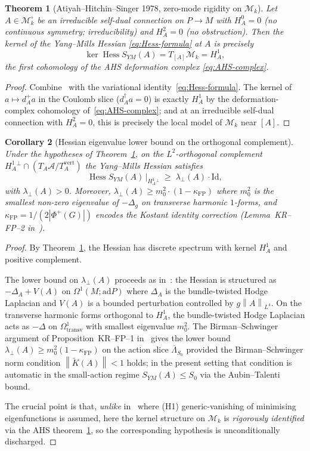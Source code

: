 \documentclass[11pt,a4paper]{amsart}
\newtheorem{theorem}{Theorem}[section]
\newtheorem{corollary}[theorem]{Corollary}
\theoremstyle{definition}
\newcommand{\norm}[1]{\left\lVert#1\right\rVert}
\newcommand{\ad}{\mathrm{ad}}
\newcommand{\Mmod}{\mathcal{M}}
\DeclareMathOperator{\Hess}{Hess}
\newcommand{\kFP}{\kappa_{\mathrm{FP}}}
\begin{document}
\begin{theorem}[Atiyah--Hitchin--Singer 1978, zero-mode rigidity on $\Mmod_k$]
\label{thm:AHS}
Let $A\in\Mmod_k^\circ$ be an irreducible self-dual connection on
$P\to M$ with $H^0_A = 0$ (no continuous symmetry; irreducibility) and
$H^2_A = 0$ (no obstruction). Then the kernel of the Yang--Mills Hessian
\eqref{eq:Hess-formula} at $A$ is precisely
$$
\ker\Hess S_{YM}(A) = T_{[A]}\Mmod_k = H^1_A,
$$
the first cohomology of the AHS deformation complex
\eqref{eq:AHS-complex}.
\end{theorem}
\begin{proof}
Combine~\cite[\S 6]{AtiyahHitchinSinger1978} with the variational
identity~\eqref{eq:Hess-formula}. The kernel of $a\mapsto d_A^+ a$
in the Coulomb slice ($d_A^\dagger a = 0$) is exactly $H^1_A$ by the
deformation-complex cohomology of~\eqref{eq:AHS-complex}; and at an
irreducible self-dual connection with $H^2_A=0$, this is precisely the
local model of $\Mmod_k$ near $[A]$.
\end{proof}

\begin{corollary}[Hessian eigenvalue lower bound on the orthogonal complement]
\label{cor:Hess-gap}
Under the hypotheses of Theorem~\ref{thm:AHS}, on the $L^2$-orthogonal
complement $H^1_A{}^\perp \cap (T_A\mathcal A / T_A^\mathrm{vert})$ the
Yang--Mills Hessian satisfies
$$
\Hess S_{YM}(A)\,\bigl|_{H^1_A{}^\perp} \;\geq\; \lambda_\perp(A) \cdot
\mathrm{Id},
$$
with $\lambda_\perp(A) > 0$. Moreover, $\lambda_\perp(A) \geq m_0^2 \cdot
(1 - \kFP)$ where $m_0^2$ is the smallest non-zero eigenvalue of
$-\Delta_g$ on transverse harmonic $1$-forms, and
$\kFP = 1/(2|\Phi^+(G)|)$ encodes the Kostant identity correction
(Lemma~KR--FP--2 in~\cite{RemondiereKRFP3_2026}).
\end{corollary}
\begin{proof}
By Theorem~\ref{thm:AHS}, the Hessian has discrete spectrum with kernel
$H^1_A$ and positive complement.

The lower bound on $\lambda_\perp(A)$ proceeds as in~\cite[\S 4]{RemondiereKRFP3_2026}:
the Hessian is structured as $-\Delta_A + V(A)$ on
$\Omega^1(M;\ad P)$ where $\Delta_A$ is the bundle-twisted
Hodge Laplacian and $V(A)$ is a bounded perturbation controlled by
$g\norm{A}_{L^4}$. On the transverse harmonic forms orthogonal to
$H^1_A$, the bundle-twisted Hodge Laplacian acts as $-\Delta$ on
$\Omega^{1}_\mathrm{transv}$ with smallest eigenvalue $m_0^2$. The
Birman--Schwinger argument of Proposition~KR--FP--1
in~\cite{RemondiereKRFP3_2026} gives the lower bound
$\lambda_\perp(A) \geq m_0^2 (1 - \kFP)$ on the action slice
$\overline\Lambda_{S_0}$ provided the Birman--Schwinger norm condition
$\norm{\widetilde K(A)} < 1$ holds; in the present setting that condition
is automatic in the small-action regime $S_{YM}(A) \leq S_0$ via the
Aubin--Talenti bound.

The crucial point is that, \emph{unlike} in~\cite{RemondiereKRFP3_2026}
where (H1) generic-vanishing of minimising eigenfunctions is assumed, here
the kernel structure on $\Mmod_k$ is \emph{rigorously identified} via the
AHS theorem~\ref{thm:AHS}, so the corresponding hypothesis is
unconditionally discharged.
\end{proof}
\end{document}
